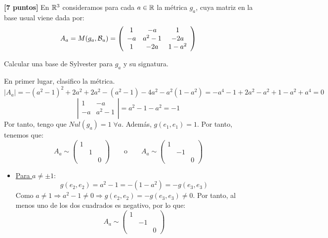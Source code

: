 \documentclass[12pt]{article}
\begin{document}
    \begin{ejercicio}\textbf{[7 puntos]}
    En $\mathbb{R}^3$ consideramos para cada $a\in \mathbb{R}$ la métrica $g_a$, cuya matriz en la base usual viene dada por:
    \begin{equation*}
        A_a = M(g_a, \mathcal{B}_u) = \left(\begin{array}{ccc}
            1 & -a & 1 \\
            -a & a^2-1 & -2a \\
            1 & -2a & 1-a^2
        \end{array}\right)
    \end{equation*}

    Calcular una base de Sylvester para $g_a$ y su signatura.

    En primer lugar, clasifico la métrica.
    \begin{equation*}
        |A_a| = -(a^2-1)^2+2a^2+2a^2-(a^2-1)-4a^2-a^2(1-a^2) = -a^4-1+2a^2 -a^2+1-a^2+a^4 = 0
    \end{equation*}
    \begin{equation*}
        \left|\begin{array}{ccc}
            1 & -a \\
            -a & a^2-1 \\
        \end{array}\right| = a^2-1-a^2=-1
    \end{equation*}
    Por tanto, tengo que $Nul(g_a)=1\;\forall a$. Además, $g(e_1, e_1)=1$. Por tanto, tenemos que:
    \begin{equation*}
        A_a\sim \left(\begin{array}{ccc}
             1 \\
              & 1 \\
              && 0
        \end{array}\right)
        \qquad \text{o} \qquad
        A_a\sim \left(\begin{array}{ccc}
             1 \\
              & -1 \\
              && 0
        \end{array}\right)
    \end{equation*}

    \begin{itemize}
        \item \underline{Para $a\neq \pm1$}:
        \begin{equation*}
            g(e_2, e_2) = a^2-1 = -(1-a^2) = -g(e_3, e_3)
        \end{equation*}
        Como $a\neq 1\Longrightarrow a^2-1\neq 0 \Longrightarrow g(e_2, e_2)=-g(e_3, e_3)\neq 0$. Por tanto, al menos uno de los dos cuadrados es negativo, por lo que:
        \begin{equation*}
            A_a\sim \left(\begin{array}{ccc}
             1 \\
              & -1 \\
              && 0
            \end{array}\right)
        \end{equation*}


\end{itemize}
\end{ejercicio}
\end{document}
